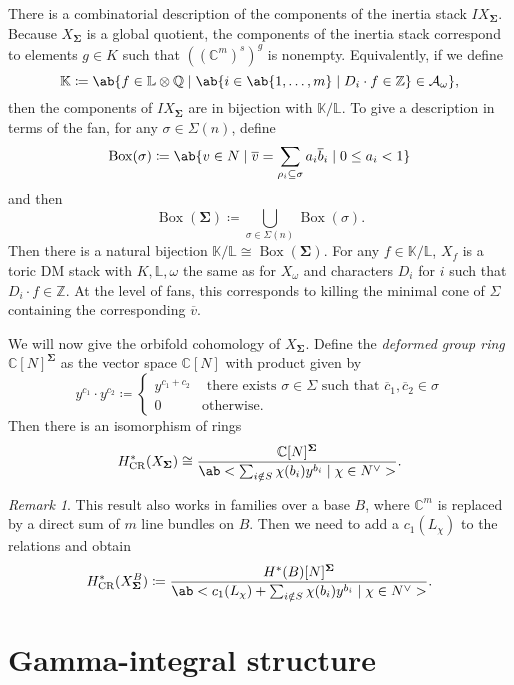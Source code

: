 \documentclass{amsart}
\theoremstyle{definition}
\theoremstyle{remark}
\newtheorem{rmk}[thm]{Remark}
\theoremstyle{plain}
\theoremstyle{definition}
\theoremstyle{remark}
\newcommand{\C}{\mathbb{C}}
\newcommand{\Z}{\mathbb{Z}}
\newcommand{\Q}{\mathbb{Q}}
\renewcommand{\L}{\mathbb{L}}
\newcommand{\mc}[1]{\mathcal{#1}}
\newcommand{\mr}[1]{\mathrm{#1}}
\newcommand{\on}[1]{\operatorname{#1}}
\newcommand{\ol}[1]{\overline{#1}}
\newcommand{\1}{\mathbf{1}}
\newcommand{\2}{\mathbf{2}}
\newcommand{\3}{\mathbf{3}}
\begin{document}
There is a combinatorial description of the components of the inertia stack $IX_{\bm{\Sigma}}$. Because $X_{\bm{\Sigma}}$ is a global quotient, the components of the inertia stack correspond to elements $g \in K$ such that $( (\C^m)^s )^g$ is nonempty. Equivalently, if we define
\[ \mathbb{K} \coloneqq \ab\{f \in \L \otimes \Q \mid \ab\{ i \in \ab\{1,\ldots,m\} \mid D_i \cdot f \in \Z\} \in \mc{A}_{\omega}\}, \]
then the components of $IX_{\bm{\Sigma}}$ are in bijection with $\mathbb{K}/\L$. To give a description in terms of the fan, for any $\sigma \in \Sigma(n)$, define
\[ \on{Box}(\sigma) \coloneqq \ab\{v \in N \mid \ol{v} = \sum_{\rho_i \subseteq \sigma} a_i \ol{b}_i \mid 0 \leq a_i < 1\}\]
and then
\[ \on{Box}(\bm{\Sigma}) \coloneqq \bigcup_{\sigma \in \Sigma(n)} \on{Box}(\sigma). \]
Then there is a natural bijection $\mathbb{K}/\L \cong \on{Box}(\bm{\Sigma})$. For any $f \in \mathbb{K}/\L$, $X_f$ is a toric DM stack with $K, \L, \omega$ the same as for $X_{\omega}$ and characters $D_i$ for $i$ such that $D_i \cdot f \in \Z$. At the level of fans, this corresponds to killing the minimal cone of $\Sigma$ containing the corresponding $\ol{v}$.

We will now give the orbifold cohomology of $X_{\bm{\Sigma}}$. Define the \textit{deformed group ring} $\C[N]^{\bm{\Sigma}}$ as the vector space $\C[N]$ with product given by
\[ y^{c_1} \cdot y^{c_2} \coloneqq \begin{cases}
    y^{c_1 + c_2} & \text{ there exists } \sigma \in \Sigma \text{ such that } \ol{c}_1, \ol{c}_2 \in \sigma \\
    0 & \text{otherwise}.
\end{cases}
\]
Then there is an isomorphism of rings
\[ H^*_{\mr{CR}}(X_{\bm{\Sigma}}) \cong \frac{\C[N]^{\bm{\Sigma}}}{\ab<\sum_{i \notin S} \chi(b_i) y^{b_i} \mid \chi \in N^{\vee}>}. \]
\begin{rmk}
    This result also works in families over a base $B$, where $\C^m$ is replaced by a direct sum of $m$ line bundles on $B$. Then we need to add a $c_1(L_{\chi})$ to the relations and obtain
    \[ H^*_{\mr{CR}}(X^B_{\bm{\Sigma}}) \coloneqq \frac{H^*(B)[N]^{\bm{\Sigma}}}{\ab<c_1(L_{\chi}) + \sum_{i \notin S} \chi(b_i) y^{b_i} \mid \chi \in N^{\vee}>}. \]
\end{rmk}

\section{Gamma-integral structure}%
\label{sec:Gamma-integral structure}
\end{document}
